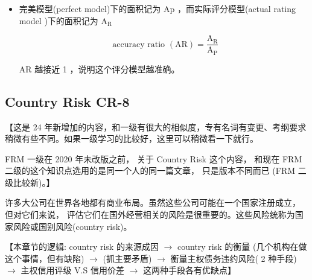 \begin{itemize}
\item 完美模型(perfect model)下的面积记为 \(\mathrm{{Ap}}\) ，而实际评分模型(actual rating model )下的面积记为 \({\mathrm{A}}_{\mathrm{R}}\)

\[
\text{ accuracy ratio }\left( \mathrm{{AR}}\right)  = \frac{{\mathrm{A}}_{\mathrm{R}}}{{\mathrm{A}}_{\mathrm{P}}}
\]

 AR 越接近 1 ，说明这个评分模型越准确。

\end{itemize}

\subsection{Country Risk CR-8}


【这是 24 年新增加的内容，和一级有很大的相似度，专有名词有变更、考纲要求稍微有些不同。如果一级学习的比较好，这里可以稍微看一下就行。

FRM 一级在 2020 年未改版之前， 关于 Country Risk 这个内容， 和现在 FRM 二级的这个知识点选用的是同一个人的同一篇文章， 只是版本不同而已 (FRM 二级比较新)。】

许多大公司在世界各地都有商业布局。虽然这些公司可能在一个国家注册成立， 但对它们来说， 评估它们在国外经营相关的风险是很重要的。这些风险统称为国家风险或国别风险(country risk)。

【本章节的逻辑: country risk 的来源成因 \(\rightarrow\) country risk 的衡量 (几个机构在做这个事情，但有缺陷) \(\rightarrow\) (抓主要矛盾) \(\rightarrow\) 衡量主权债务违约风险( 2 种手段) \(\rightarrow\) 主权信用评级 V.S 信用价差 \(\rightarrow\) 这两种手段各有优缺点】


